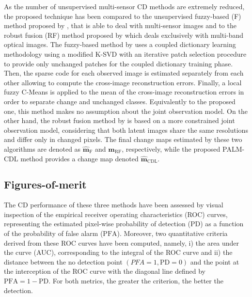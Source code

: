 \documentclass[review]{elsarticle}
\begin{document}
As the number of unsupervised multi-sensor CD methods are extremely reduced, the proposed technique has been compared to the unsupervised fuzzy-based (F) method proposed by \citet{gong_coupled_2016}, that is able to deal with multi-sensor images and to the robust fusion (RF) method proposed by \citet{ferraris_robust_2017} which deals exclusively with multi-band optical images. The fuzzy-based method by \citet{gong_coupled_2016} uses a coupled dictionary learning methodology using a modified K-SVD \citep{aharon_k-svd_2006} with an iterative patch selection procedure to provide only unchanged patches for the coupled dictionary training phase. Then, the sparse code for each observed image is estimated separately from each other allowing to compute the cross-image reconstruction errors. Finally, a local fuzzy C-Means is applied to the mean of the cross-image reconstruction errors in order to separate change and unchanged classes. Equivalently to the proposed one, this method makes no assumption about the joint observation model. On the other hand, the robust fusion method by \citet{ferraris_robust_2017} is based on a more constrained joint observation model, considering that both latent images share the same resolutions and differ only in changed pixels. The final change maps estimated by these two algorithms are denoted as $\hat{\mathbf{m}}_{\mathrm{F}}$ and  $\hat{\mathbf{m}}_{\mathrm{RF}}$, respectively, while the proposed PALM-CDL method provides a change map denoted $\hat{\mathbf{m}}_{\mathrm{CDL}}$.

\subsection{Figures-of-merit}	
\label{subsec:figures_of_merit}
The CD performance of these three methods have been assessed by visual inspection of the empirical receiver operating characteristics (ROC) curves, representing the estimated pixel-wise probability of detection ($\mathrm{PD}$) as a function of the probability of false alarm ($\mathrm{PFA}$). Moreover, two quantitative criteria derived from these ROC curves have been computed, namely, i) the area under the curve (AUC), corresponding to the integral of the ROC curve and ii) the distance between the no detection point $(PFA = 1, \mathrm{PD} = 0)$ and the point at the interception of the ROC curve with the diagonal line defined by $\mathrm{PFA} = 1 - \mathrm{PD}$. For both metrics, the greater the criterion, the better the detection.
\end{document}
